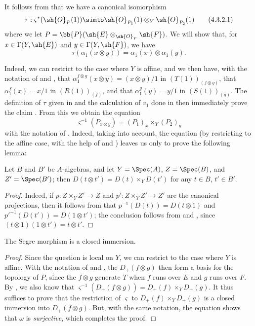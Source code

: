 \begin{env}[4.3.2]
\label{II.4.3.2}
It follows from  that we have a canonical isomorphism
\[
\label{II.4.3.2.1}
  \tau: \varsigma^*(\sh{O}_P(1)) \simto \sh{O}_{P_1}(1)\otimes_Y\sh{O}_{P_2}(1)
  \tag{4.3.2.1}
\]
where we let $P=\bb{P}(\sh{E}\otimes_{\sh{O}_Y}\sh{F})$.
We will show that, for $x\in\Gamma(Y,\sh{E})$ and $y\in\Gamma(Y,\sh{F})$, we have
\[
\label{II.4.3.2.2}
  \tau(\alpha_1(x\otimes y)) = \alpha_1(x)\otimes\alpha_1(y).
  \tag{4.3.2.2}
\]

Indeed, we can restrict to the case where $Y$ is affine, and we then have, with the notation of  and , that $\alpha_1^{f\otimes g}(x\otimes y)=(x\otimes y)/1$ in $(T(1))_{(f\otimes g)}$, that $\alpha_1^f(x)=x/1$ in $(R(1))_{(f)}$, and that $\alpha_1^g(y)=y/1$ in $(S(1))_{(g)}$.
The definition of $\tau$ given in  and the calculation of $v_1$ done in  then immediately prove the claim .
From this we obtain the equation
\[
\label{II.4.3.2.3}
  \varsigma^{-1}(P_{x\otimes y}) = (P_1)_x\times_Y(P_2)_y
  \tag{4.3.2.3}
\]
with the notation of .
Indeed, taking  into account, the equation  (by restricting to the affine case, with the help of  and ) leaves us only to prove the following lemma:
\begin{lemma}[4.3.2.4]
\label{II.4.3.2.4}
Let $B$ and $B'$ be $A$-algebras, and let $Y=\Spec(A)$, $Z=\Spec(B)$, and $Z'=\Spec(B')$;
then $D(t\otimes t')=D(t)\times_Y D(t')$ for any $t\in B$, $t'\in B'$.
\end{lemma}
\begin{proof}
Indeed, if $p:Z\times_Y Z'\to Z$ and $p':Z\times_Y Z'\to Z'$ are the canonical projections, then it follows from  that $p^{-1}(D(t))=D(t\otimes1)$ and $p'^{-1}(D(t'))=D(1\otimes t')$;
the conclusion follows from  and , since $(t\otimes1)(1\otimes t')=t\otimes t'$.
\end{proof}
\end{env}

\begin{proposition}[4.3.3]
\label{II.4.3.3}
The Segre morphism is a closed immersion.
\end{proposition}

\begin{proof}
Since the question is local on $Y$, we can restrict to the case where $Y$ is affine.
With the notation of  and , the $D_+(f\otimes g)$ then form a basis for the topology of $P$, since the $f\otimes g$ generate $T$ when $f$ runs over $E$ and $g$ runs over $F$.
By , we also know that $\varsigma^{-1}(D_+(f\otimes g))=D_+(f)\times_Y D_+(g)$.
It thus suffices  to prove that the restriction of $\varsigma$ to $D_+(f)\times_Y D_+(g)$ is a closed immersion into $D_+(f\otimes g)$.
But, with the same notation, the equation  shows that $\omega$ is \emph{surjective}, which completes the proof.
\end{proof}

